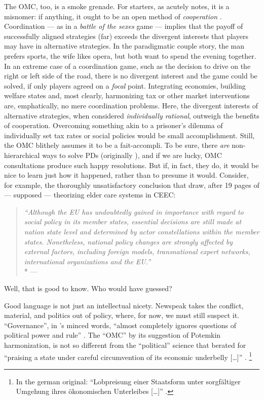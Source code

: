 The \gls{OMC}, too, is a smoke grenade.
For starters, as \citeauthor{Offe2003} acutely notes, it is a misnomer:
if anything, it ought to be an open method of \emph{cooperation} \citeyearpar[467]{Offe2003}.
Coordination --- as in a \emph{battle of the sexes} game --- implies that the payoff of successfully aligned strategies (far) exceeds the divergent interests that players may have in alternative strategies.
In the paradigmatic couple story, the man prefers sports, the wife likes opera, but both want to spend the evening together.
In an extreme case of a coordination game, such as the decision to drive on the right or left side of the road, there is no divergent interest and the game could be solved, if only players agreed on a \emph{focal} point.
Integrating economies, building welfare states and, most clearly, harmonizing tax or other market interventions are, emphatically, no mere coordination problems.
Here, the divergent interests of alternative strategies, when considered \emph{individually rational}, outweigh the benefits of cooperation.
Overcoming something akin to a prisoner's dilemma of individually set tax rates or social policies would be small accomplishment.
Still, the \gls{OMC} blithely assumes it to be a fait-accompli.
To be sure, there \emph{are} non-hierarchical ways to solve \glspl{PD} (originally \citealt{Axelrod1980}), and if we are lucky, \gls{OMC} consultations produce such happy resolutions.
But if, in fact, they do, it would be nice to learn just how it happened, rather than to presume it would.
Consider, for example, the thoroughly unsatisfactory conclusion that \citeauthor{Theobald2009} draw, after 19 pages of --- supposed --- theorizing elder care systems in \gls{CEEC}:
\begin{quote}
	\emph{``Although the \gls{EU} has undoubtedly gained in importance with regard to social policy in its member states, essential decisions are still made at nation state level and determined by actor constellations within the member states.
	Nonetheless, national policy changes are strongly affected by external factors, including foreign models, transnational expert networks, international organizations and the \gls{EU}.''}
	\\*
	--- \citet[163]{Theobald2009}
\end{quote}
Well, that is good to know.
Who would have guessed?

Good language is not just an intellectual nicety.
Newspeak takes the conflict, material, and politics out of policy, where, for now, we must still suspect it.
``Governance'', in \citeauthor{Jachtenfuchs2001}'s minced words, ``almost completely ignores questions of political power and rule'' \citeyearpar[258]{Jachtenfuchs2001}.
The ``\gls{OMC}'' by its suggestion of Potemkin harmonization, is not so different from the ``political'' science that \cite{Agnoli-1989-aa} berated for ``praising a state under careful circumvention of its economic underbelly [\ldots]'' \citeyearpar[195]{Agnoli-1989-aa}.
\footnote{
	In the german original:
``Lobpreisung einer Staatsform unter sorgfältiger Umgehung ihres ökonomischen Unterleibes [\ldots]'' \citep[195]{Agnoli-1989-aa}.
}

